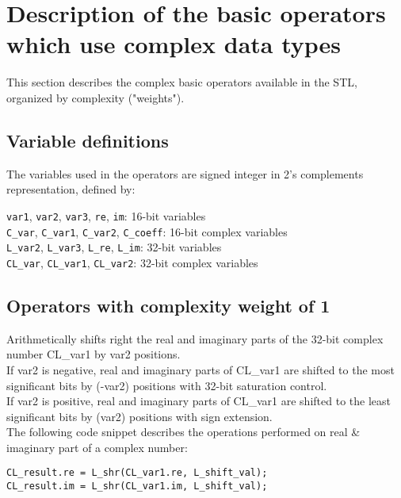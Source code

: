 \section{Description of the basic operators which use complex data types }

This section describes the complex basic operators available in the STL, organized by complexity ("weights").

\subsection{Variable definitions}

The variables used in the operators are signed integer in 2's complements representation, defined by:

{\tt var1}, {\tt var2}, {\tt var3}, {\tt re}, {\tt im}: 16-bit variables\\
{\tt C\_var}, {\tt C\_var1}, {\tt C\_var2}, {\tt C\_coeff}: 16-bit complex variables\\
{\tt L\_var2}, {\tt L\_var3}, {\tt L\_re}, {\tt L\_im}: 32-bit variables\\
{\tt CL\_var}, {\tt CL\_var1}, {\tt CL\_var2}: 32-bit complex variables

\subsection{Operators with complexity weight of 1}


Arithmetically shifts right the real and imaginary parts of the 32-bit complex number CL\_var1 by var2 positions.\\
If var2 is negative, real and imaginary parts of CL\_var1 are shifted to the most significant bits by (-var2) positions with 32-bit saturation control.\\
If var2 is positive, real and imaginary parts of CL\_var1 are shifted to the least significant bits by (var2) positions with sign extension.\\
The following code snippet describes the operations performed on real \& imaginary part of a complex number:

{\tt {}CL\_result.re = L\_shr(CL\_var1.re, L\_shift\_val);\\
     CL\_result.im = L\_shr(CL\_var1.im, L\_shift\_val);\\
}


